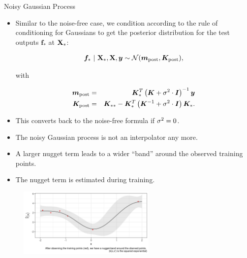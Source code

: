 \begin{frame}[c,allowframebreaks]{Noisy Gaussian Process}
\begin{itemize}
\item Similar to the noise-free case, we condition according to the rule of conditioning for Gaussians to get the posterior distribution for the test outputs $\bm{f}_*$ at $\mathbf{X}_*$:

\begin{eqnarray*}
\bm{f}_* ~|~ \mathbf{X}_*, \mathbf{X}, \bm{y} \sim \mathcal{N}(\bm{m}_{\text{post}}, \bm{K}_\text{post}),
\end{eqnarray*}

with 

\begin{eqnarray*}
\bm{m}_{\text{post}} &=& \Kmat_{*}^{T} \left(\Kmat+ \sigma^2 \cdot \id\right)^{-1}\bm{y} \\
\lz
\bm{K}_\text{post} &=& \Kmat_{**} - \Kmat_*^T \left(\Kmat ^{-1} + \sigma^2 \cdot \id\right)\Kmat_*.
\end{eqnarray*}

\end{itemize}

\begin{itemize}
\item This converts back to the noise-free formula if $\sigma^2 = 0$.
\end{itemize}

\framebreak

\begin{itemize}
\item The noisy Gaussian process is not an interpolator any more.
\item A larger nugget term leads to a wider ``band'' around the observed training points.
\item The nugget term is estimated during training.
\end{itemize}


\begin{figure}
\includegraphics[width=0.6\textwidth]{figure_man/gp-regression.png}
\end{figure}

\end{frame}

